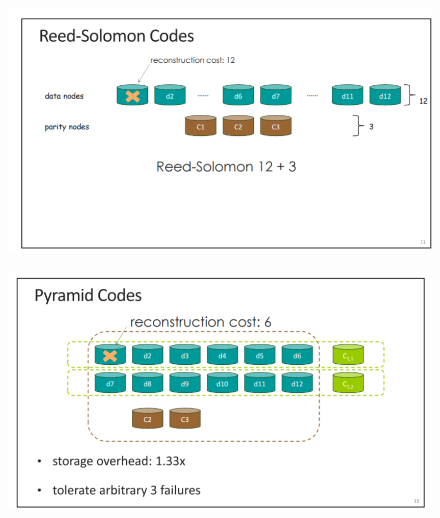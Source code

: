 \documentclass{article}
\begin{document}
\begin{figure}[tbp]%
\begin{mdcenter}%

\noindent\includegraphics[keepaspectratio=true,width=\dimmin{}{\dimwidth{0.60}}]{images/lrc1}{}%

\mdhr{}%

\noindent{}%
\end{mdcenter}%
\end{figure}%

\begin{figure}[tbp]%
\begin{mdcenter}%

\noindent\includegraphics[keepaspectratio=true,width=\dimmin{}{\dimwidth{0.60}}]{images/lrc2}{}%

\mdhr{}%

\noindent{}%
\end{mdcenter}%
\end{figure}%
\end{document}
